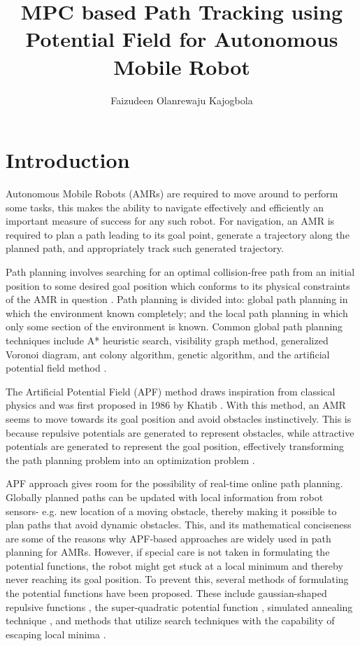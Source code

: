 \documentclass[a4paper, twocolumn]{article}
\title{\Huge{MPC based Path Tracking using Potential Field for Autonomous Mobile Robot}}
\author{Faizudeen Olanrewaju Kajogbola}
\date{} %
\begin{document}
\maketitle

\setlength{\headsep}{5pt}
\setlength{\voffset}{-0.75in}   %

\section{Introduction}

Autonomous Mobile Robots (AMRs) are required to move around to perform some tasks, 
this makes the ability to navigate effectively and efficiently an important measure of success for any such robot.
For navigation, an AMR is required to plan a path leading to its goal point, 
generate a trajectory along the planned path, and appropriately track such generated trajectory.

Path planning involves searching for an optimal collision-free path from an initial position to some 
desired goal position which conforms to its physical constraints of the AMR in question \cite{cai1}.
Path planning is divided into: global path planning in which the environment known completely; 
and the local path planning in which only some section of the environment is known.
Common global path planning techniques include A* heuristic search, visibility graph method, generalized Voronoi diagram, 
ant colony algorithm, genetic algorithm, and the artificial potential field method \cite{kunchev1, shi1}.

The Artificial Potential Field (APF) method draws inspiration from classical physics and was first proposed in 1986 by Khatib \cite{khatib1}.
With this method, an AMR seems to move towards its goal position and avoid obstacles instinctively. 
This is because repulsive potentials are generated to represent obstacles, while attractive potentials are 
generated to represent the goal position, effectively transforming the path planning problem into an 
optimization problem \cite{ji1}. 

APF approach gives room for the possibility of real-time online path planning. 
Globally planned paths can be updated with local information from robot sensors- 
e.g. new location of a moving obstacle, thereby making it possible to plan paths that avoid dynamic obstacles.
This, and its mathematical conciseness \cite{shi1} are some of the reasons why APF-based approaches 
are widely used in path planning for AMRs.
However, if special care is not taken in formulating the potential functions, the robot might get stuck at 
a local minimum and thereby never reaching its goal position.
To prevent this, several methods of formulating the potential functions have been proposed. 
These include gaussian-shaped repulsive functions \cite{koditschek1}, the super-quadratic potential function \cite{volpe1}, 
simulated annealing technique \cite{zhu1}, and methods that utilize search techniques with the capability of escaping local minima \cite{barraquand1}.
\end{document}
